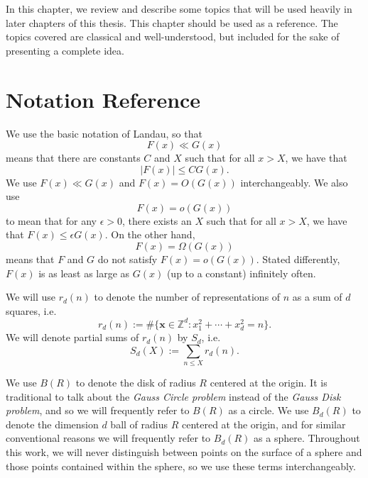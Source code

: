 
In this chapter, we review and describe some topics that will be used heavily in later
chapters of this thesis.
This chapter should be used as a reference.
The topics covered are classical and well-understood, but included for the sake of
presenting a complete idea.



\section{Notation Reference}

We use the basic notation of Landau, so that
\begin{equation}
  F(x) \ll G(x)
\end{equation}
means that there are constants $C$ and $X$ such that for all $x > X$, we have that
\begin{equation}
  \lvert F(x) \rvert \leq C G(x).
\end{equation}
We use $F(x) \ll G(x)$ and $F(x) = O(G(x))$ interchangeably.
We also use
\begin{equation}
  F(x) = o(G(x))
\end{equation}
to mean that for any $\epsilon > 0$, there exists an $X$ such that for all $x > X$, we
have that $F(x) \leq \epsilon G(x)$.
On the other hand,
\begin{equation}
  F(x) = \Omega(G(x))
\end{equation}
means that $F$ and $G$ do not satisfy $F(x) = o(G(x))$.
Stated differently, $F(x)$ is as least as large as $G(x)$ (up to a constant) infinitely
often.



We will use $r_d(n)$ to denote the number of representations of $n$ as a sum of $d$
squares, i.e.\
\begin{equation}
  r_d(n) := \# \{ \bm x \in \mathbb{Z}^d : x_1^2 + \cdots + x_d^2 = n \}.
\end{equation}
We will denote partial sums of $r_d(n)$ by $S_d$, i.e.\
\begin{equation}
  S_d(X) := \sum_{n \leq X} r_d(n).
\end{equation}


We use $B(R)$ to denote the disk of radius $R$ centered at the origin.
It is traditional to talk about the \emph{Gauss Circle problem} instead of the \emph{Gauss
Disk problem}, and so we will frequently refer to $B(R)$ as a circle.
We use $B_d(R)$ to denote the dimension $d$ ball of radius $R$ centered at the origin, and
for similar conventional reasons we will frequently refer to $B_d(R)$ as a sphere.
Throughout this work, we will never distinguish between points on the surface of a sphere
and those points contained within the sphere, so we use these terms interchangeably.


